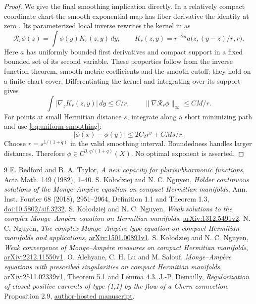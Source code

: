 \documentclass[11pt]{article}
\begin{document}
\begin{proof}
We give the final smoothing implication directly. In a relatively
compact coordinate chart the smooth exponential map has fiber derivative
the identity at zero \cite[Proposition 2.9]{Dem}. Its parameterized
local inverse rewrites the
kernel in \cite[(2.7)--(2.8)]{KN} as
\[
 \mathcal R_r\phi(z)=\int\phi(y)K_r(z,y)\,dy,\qquad
 K_r(z,y)=r^{-2n}a\bigl(z,(y-z)/r,r\bigr).
\]
Here $a$ has uniformly bounded first derivatives and compact support in
a fixed bounded set of its second variable. These properties follow
from the inverse function theorem, smooth metric coefficients and
the smooth cutoff; they hold on a finite chart cover. Differentiating
the kernel and integrating over its support gives
\[
 \int|\nabla_zK_r(z,y)|\,dy\leq C/r,
 \qquad\|\nabla\mathcal R_r\phi\|_\infty\leq CM/r.
\]
For points at small Hermitian distance $s$, integrate along a short
minimizing path and use \eqref{eq:uniform-smoothing}:
\[
 |\phi(x)-\phi(y)|\leq2C_2r^q+CMs/r.
\]
Choose $r=s^{1/(1+q)}$ in the valid smoothing interval. Boundedness
handles larger distances. Therefore $\phi\in C^{0,q/(1+q)}(X)$.
No optimal exponent is asserted.
\end{proof}

\begin{thebibliography}{9}
 E. Bedford and B. A. Taylor,
\emph{A new capacity for plurisubharmonic functions}, Acta Math.
149 (1982), 1--40.
 S. Ko\l odziej and N. C. Nguyen,
\emph{H\"older continuous solutions of the Monge--Amp\`ere equation
on compact Hermitian manifolds}, Ann. Inst. Fourier 68 (2018),
2951--2964, Definition 1.1 and Theorem 1.3,
\href{https://aif.centre-mersenne.org/item/10.5802/aif.3232.pdf}
{doi:10.5802/aif.3232}.
 S. Ko\l odziej and N. C. Nguyen,
\emph{Weak solutions to the complex Monge--Amp\`ere equation on
Hermitian manifolds}, \href{https://arxiv.org/abs/1312.5491v2}
{arXiv:1312.5491v2}.
 N. C. Nguyen,
\emph{The complex Monge--Amp\`ere type equation on compact Hermitian
manifolds and applications}, \href{https://arxiv.org/abs/1501.00891v1}
{arXiv:1501.00891v1}.
 S. Ko\l odziej and N. C. Nguyen,
\emph{Weak convergence of Monge--Amp\`ere measures on compact Hermitian
manifolds}, \href{https://arxiv.org/abs/2212.11550v1}
{arXiv:2212.11550v1}.
 O. Alehyane, C. H. Lu and M. Salouf,
\emph{Monge--Amp\`ere equations with prescribed singularities on compact
Hermitian manifolds}, \href{https://arxiv.org/abs/2511.02339v1}
{arXiv:2511.02339v1}, Theorem 5.1 and Lemma 4.3.
 J.-P. Demailly,
\emph{Regularization of closed positive currents of type (1,1) by the
flow of a Chern connection}, Proposition 2.9,
\href{https://www-fourier.univ-grenoble-alpes.fr/~demailly/manuscripts/regularization_flow.pdf}
{author-hosted manuscript}.
\end{thebibliography}
\end{document}
